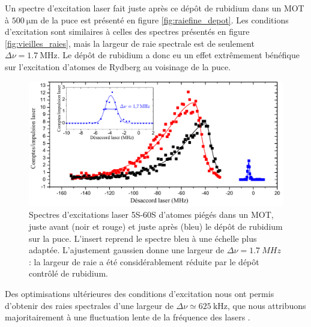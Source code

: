 Un spectre d'excitation laser fait juste après ce dépôt de rubidium dans un MOT à $\SI{500}{\um}$ de la puce est présenté en figure \eqref{fig:raiefine_depot}.
Les conditions d'excitation sont similaires à celles des spectres présentés en figure \eqref{fig:vieilles_raies}, mais la largeur de raie spectrale est de seulement $\Delta\nu=\SI{1.7}{\MHz}$.
Le dépôt de rubidium a donc eu un effet extrêmement bénéfique sur l'excitation d'atomes de Rydberg au voisinage de la puce.
%
\begin{figure}[!th]
\centering
\includegraphics[width=\linewidth]{figures/setup/rydberg/avant-apres-coating}
\caption[Spectres d'excitations laser 5S-60S avant et après le dépôt de rubidium sur la puce]{
Spectres d'excitations laser 5S-60S d'atomes piégés dans un MOT, juste avant (noir et rouge) et juste après (bleu) le dépôt de rubidium sur la puce.
L'insert reprend le spectre bleu à une échelle plus adaptée.
L'ajustement gaussien donne une largeur de $\Delta\nu=\SI{1.7}{MHz}$ :
la largeur de raie a été considérablement réduite par le dépôt contrôlé de rubidium.
}
\label{fig:raiefine_depot}
\end{figure}

Des optimisations ultérieures des conditions d'excitation nous ont permis d'obtenir des raies spectrales d'une largeur de $\Delta\nu \simeq \SI{625}{\kHz}$, que nous attribuons majoritairement à une fluctuation lente de la fréquence des lasers \cite{PHD_CELISTRINO}.

		
